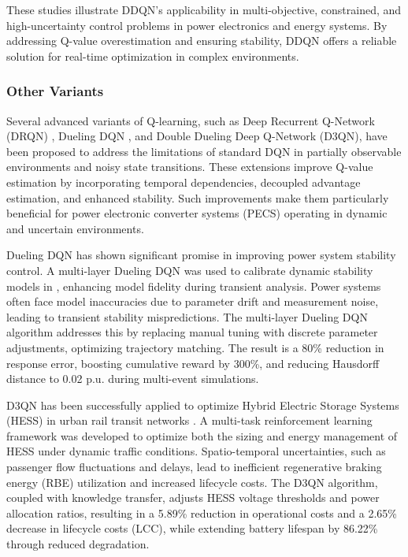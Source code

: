 These studies illustrate DDQN's applicability in multi-objective, constrained, and high-uncertainty control problems in power electronics and energy systems. By addressing Q-value overestimation and ensuring stability, DDQN offers a reliable solution for real-time optimization in complex environments.

\subsubsection{Other Variants}  
Several advanced variants of Q-learning, such as Deep Recurrent Q-Network (DRQN) \cite{hausknecht2015deep}, Dueling DQN \cite{wang2016dueling}, and Double Dueling Deep Q-Network (D3QN), have been proposed to address the limitations of standard DQN in partially observable environments and noisy state transitions. These extensions improve Q-value estimation by incorporating temporal dependencies, decoupled advantage estimation, and enhanced stability. Such improvements make them particularly beneficial for power electronic converter systems (PECS) operating in dynamic and uncertain environments.

Dueling DQN has shown significant promise in improving power system stability control. A multi-layer Dueling DQN was used to calibrate dynamic stability models in \cite{wang2020drl}, enhancing model fidelity during transient analysis. Power systems often face model inaccuracies due to parameter drift and measurement noise, leading to transient stability mispredictions. The multi-layer Dueling DQN algorithm addresses this by replacing manual tuning with discrete parameter adjustments, optimizing trajectory matching. The result is a 80\% reduction in response error, boosting cumulative reward by 300\%, and reducing Hausdorff distance to 0.02 p.u. during multi-event simulations.

D3QN has been successfully applied to optimize Hybrid Electric Storage Systems (HESS) in urban rail transit networks \cite{li2025multi}. A multi-task reinforcement learning framework was developed to optimize both the sizing and energy management of HESS under dynamic traffic conditions. Spatio-temporal uncertainties, such as passenger flow fluctuations and delays, lead to inefficient regenerative braking energy (RBE) utilization and increased lifecycle costs. The D3QN algorithm, coupled with knowledge transfer, adjusts HESS voltage thresholds and power allocation ratios, resulting in a 5.89\% reduction in operational costs and a 2.65\% decrease in lifecycle costs (LCC), while extending battery lifespan by 86.22\% through reduced degradation.


